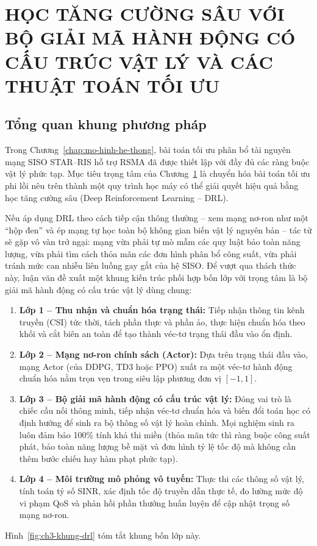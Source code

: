 \chapter{HỌC TĂNG CƯỜNG SÂU VỚI BỘ GIẢI MÃ HÀNH ĐỘNG CÓ CẤU TRÚC VẬT LÝ VÀ CÁC THUẬT TOÁN TỐI ƯU}
\label{chap:phuong-phap}

\section{Tổng quan khung phương pháp}
\label{sec:tong-quan-khung}

Trong Chương~\ref{chap:mo-hinh-he-thong}, bài toán tối ưu phân bổ tài nguyên mạng SISO STAR--RIS hỗ trợ RSMA
đã được thiết lập với đầy đủ các ràng buộc vật lý phức tạp. Mục tiêu trọng tâm của Chương~\ref{chap:phuong-phap}
là chuyển hóa bài toán tối ưu phi lồi nêu trên thành một quy trình học máy có thể giải quyết hiệu quả bằng học
tăng cường sâu (Deep Reinforcement Learning -- DRL).

Nếu áp dụng DRL theo cách tiếp cận thông thường -- xem mạng nơ-ron như một ``hộp đen'' và ép mạng tự học toàn
bộ không gian biến vật lý nguyên bản -- tác tử sẽ gặp vô vàn trở ngại: mạng vừa phải tự mò mẫm các quy luật
bảo toàn năng lượng, vừa phải tìm cách thỏa mãn các đơn hình phân bổ công suất, vừa phải tránh mức can nhiễu
liên luồng gay gắt của hệ SISO. Để vượt qua thách thức này, luận văn đề xuất một khung kiến trúc phối hợp bốn
lớp với trọng tâm là bộ giải mã hành động có cấu trúc vật lý dùng chung:
\begin{enumerate}
\item \textbf{Lớp 1 -- Thu nhận và chuẩn hóa trạng thái:} Tiếp nhận thông tin kênh truyền (CSI) tức thời, tách
  phần thực và phần ảo, thực hiện chuẩn hóa theo khối và cắt biên an toàn để tạo thành véc-tơ trạng thái đầu
  vào ổn định.
\item \textbf{Lớp 2 -- Mạng nơ-ron chính sách (Actor):} Dựa trên trạng thái đầu vào, mạng Actor (của DDPG, TD3
  hoặc PPO) xuất ra một véc-tơ hành động chuẩn hóa nằm trọn vẹn trong siêu lập phương đơn vị $[-1, 1]$.
\item \textbf{Lớp 3 -- Bộ giải mã hành động có cấu trúc vật lý:} Đóng vai trò là chiếc cầu nối thông minh,
  tiếp nhận véc-tơ chuẩn hóa và biến đổi toán học có định hướng để sinh ra bộ thông số vật lý hoàn chỉnh. Mọi
  nghiệm sinh ra luôn đảm bảo 100\% tính khả thi miền (thỏa mãn tức thì ràng buộc công suất phát, bảo toàn năng
  lượng bề mặt và đơn hình tỷ lệ tốc độ mà không cần thêm bước chiếu hay hàm phạt phức tạp).
\item \textbf{Lớp 4 -- Môi trường mô phỏng vô tuyến:} Thực thi các thông số vật lý, tính toán tỷ số SINR, xác
  định tốc độ truyền dẫn thực tế, đo lường mức độ vi phạm QoS và phản hồi phần thưởng huấn luyện để cập nhật
  trọng số mạng nơ-ron.
\end{enumerate}
Hình~\ref{fig:ch3-khung-drl} tóm tắt khung bốn lớp này.

